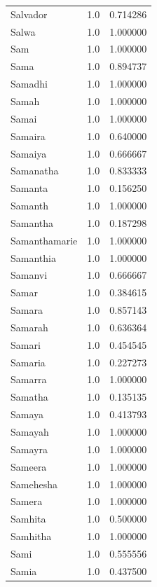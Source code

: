 \documentclass[
  letterpaper,
  DIV=11,
  numbers=noendperiod]{scrreprt}
\begin{document}
\begin{tabular}{lrr}
Salvador        &   1.0 &   0.714286 \\
Salwa           &   1.0 &   1.000000 \\
Sam             &   1.0 &   1.000000 \\
Sama            &   1.0 &   0.894737 \\
Samadhi         &   1.0 &   1.000000 \\
Samah           &   1.0 &   1.000000 \\
Samai           &   1.0 &   1.000000 \\
Samaira         &   1.0 &   0.640000 \\
Samaiya         &   1.0 &   0.666667 \\
Samanatha       &   1.0 &   0.833333 \\
Samanta         &   1.0 &   0.156250 \\
Samanth         &   1.0 &   1.000000 \\
Samantha        &   1.0 &   0.187298 \\
Samanthamarie   &   1.0 &   1.000000 \\
Samanthia       &   1.0 &   1.000000 \\
Samanvi         &   1.0 &   0.666667 \\
Samar           &   1.0 &   0.384615 \\
Samara          &   1.0 &   0.857143 \\
Samarah         &   1.0 &   0.636364 \\
Samari          &   1.0 &   0.454545 \\
Samaria         &   1.0 &   0.227273 \\
Samarra         &   1.0 &   1.000000 \\
Samatha         &   1.0 &   0.135135 \\
Samaya          &   1.0 &   0.413793 \\
Samayah         &   1.0 &   1.000000 \\
Samayra         &   1.0 &   1.000000 \\
Sameera         &   1.0 &   1.000000 \\
Samehesha       &   1.0 &   1.000000 \\
Samera          &   1.0 &   1.000000 \\
Samhita         &   1.0 &   0.500000 \\
Samhitha        &   1.0 &   1.000000 \\
Sami            &   1.0 &   0.555556 \\
Samia           &   1.0 &   0.437500 \\

\end{tabular}
\end{document}
